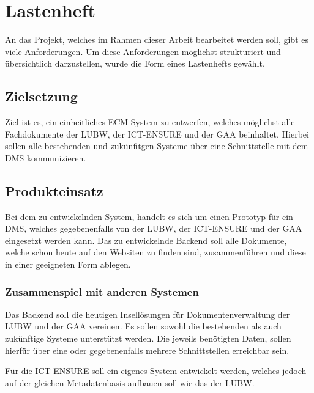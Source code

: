 \section{Lastenheft} \label{Lastenheft}
An das Projekt, welches im Rahmen dieser Arbeit bearbeitet werden soll, gibt es viele Anforderungen. Um diese Anforderungen m\"oglichst strukturiert und \"ubersichtlich darzustellen, wurde die Form eines Lastenhefts gew\"ahlt.

\subsection{Zielsetzung} \label{Zielsetzung}
Ziel ist es, ein einheitliches \ac{ECM}-System zu entwerfen, welches m\"oglichst alle Fachdokumente der \ac{LUBW}, der \ac{ICT-ENSURE} und der \ac{GAA} beinhaltet.
Hierbei sollen alle bestehenden und zuk\"unfitgen Systeme \"uber eine Schnittstelle mit dem \ac{DMS} kommunizieren.

\subsection{Produkteinsatz} \label{Produkteinsatz}
Bei dem zu entwickelnden System, handelt es sich um einen Prototyp f\"ur ein \ac{DMS}, welches gegebenenfalls von der \ac{LUBW}, der \ac{ICT-ENSURE} und der \ac{GAA} eingesetzt werden kann. Das zu entwickelnde Backend soll alle Dokumente, welche schon heute auf den Websiten zu finden sind, zusammenf\"uhren und diese in einer geeigneten Form ablegen.

\subsubsection{Zusammenspiel mit anderen Systemen} \label{Zusammenspiel mit anderen Systemen}
Das Backend soll die heutigen Insell\"osungen f\"ur Dokumentenverwaltung der \ac{LUBW} und der \ac{GAA} vereinen. Es sollen sowohl die bestehenden als auch zuk\"unftige Systeme unterst\"utzt werden. Die jeweils ben\"otigten Daten, sollen hierf\"ur \"uber eine oder gegebenenfalls mehrere Schnittstellen erreichbar sein.

F\"ur die \ac{ICT-ENSURE} soll ein eigenes System entwickelt werden, welches jedoch auf der gleichen Metadatenbasis aufbauen soll wie das der \ac{LUBW}.

